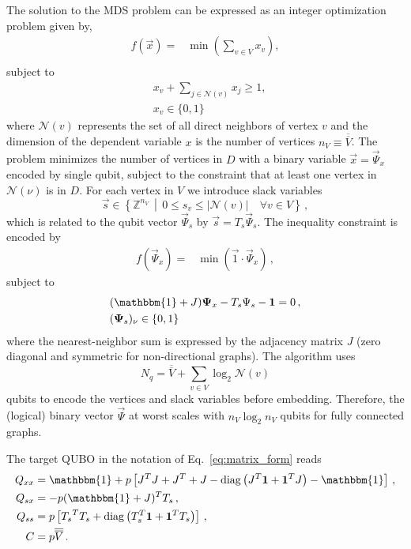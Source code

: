 \documentclass[10pt]{iopart}
\begin{document}
The solution to the MDS problem can be expressed as an integer optimization problem given by,
\begin{align}
 f(\vec x) = & \min\left(\sum_{v \in V} x_v\right),                    \\
\end{align}
subject to
\begin{align}
 & x_v + \sum_{j \in \mathcal{N}(v)} x_j \geq 1, \\
 & x_v \in \{0, 1\}
\end{align}
where $\mathcal{N}(v)$ represents the set of all direct neighbors of vertex $v$ and the dimension of the dependent variable $x$ is the number of vertices $n_V \equiv \overline{\overline{V}}$.
The problem minimizes the number of vertices in $D$ with a binary variable $\vec x = \vec \Psi_x$ encoded by single qubit, subject to the constraint that at least one vertex in $\mathcal{N}(\nu)$ is in $D$.
For each vertex in $V$ we introduce slack variables
\begin{equation}
    \vec s \in \left\{ \mathbb{Z}^{n_V} \, \middle| \, 0 \leq s_{v} \leq |\mathcal{N}(v)| \quad \forall v\in V \right\} \, ,
\end{equation}
which is related to the qubit vector $\vec \Psi_s$ by $\vec s = T_s \vec \Psi_s$.
The inequality constraint is encoded by
\begin{align}
 f(\vec \Psi_x)
 =
 & \min\left(\vec 1 \cdot \vec \Psi_x \right) \, ,
\end{align}
subject to
\begin{align}
 &
 (\mathbbm{1} + J)\vec \Psi_x - T_s \Psi_s  - \vec 1 = 0\,,
 \\
 &
 (\vec \Psi_s)_\nu \in \{ 0, 1\}
\end{align}
where the nearest-neighbor sum is expressed by the adjacency matrix $J$ (zero diagonal and symmetric for non-directional graphs).
The algorithm uses
\begin{equation}
    N_q = \overline{\overline{V}} + \sum_{v \in V} \log_2 \mathcal{N}(v)
\end{equation}
qubits to encode the vertices and slack variables before embedding.
Therefore, the (logical) binary vector $\vec \Psi$ at worst scales with $n_V \log_2 n_V$ qubits for fully connected graphs.

The target QUBO in the notation of Eq.~\eqref{eq:matrix_form} reads
 {\small
  \begin{align}
   Q_{xx} & = \mathbbm{1} + p\left[J^T J + J^T + J - \mathrm{diag}\left(J^T \vec 1 + \vec 1^T J\right) - \mathbbm{1} \right] \,, \\
   Q_{sx} & = - p(\mathbbm{1}+J)^TT_s\,,                                                                     \\
   Q_{ss} & = p\left[{T_s}^T T_s + \mathrm{diag}\left(T_s^T \vec 1 + \vec 1^T  T_s\right)\right]\,,                                  \\
   C      & =  p \overline{\overline{V}}\,.
  \end{align}}
\end{document}
